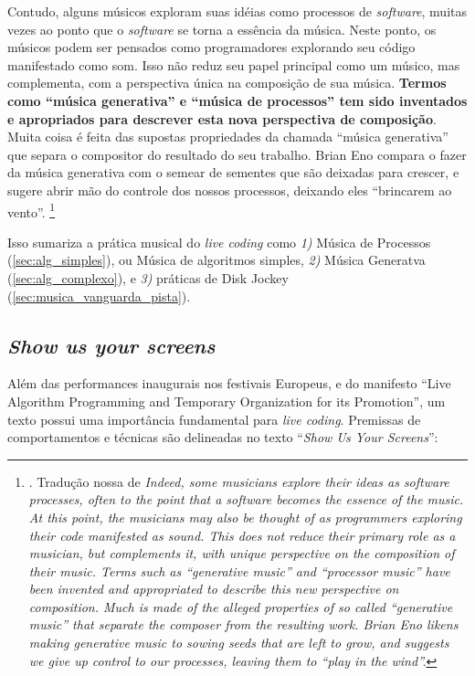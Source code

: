 \begin{citacao}
Contudo, alguns músicos exploram suas idéias como processos de \emph{software}, muitas vezes ao ponto que o \emph{software} se torna a essência da música. Neste ponto, os músicos podem ser pensados como programadores explorando seu código manifestado como som. Isso não reduz seu papel principal como um músico, mas complementa, com a perspectiva única na composição de sua música. \textbf{Termos como ``música generativa'' e ``música de processos'' tem sido inventados e apropriados para descrever esta nova perspectiva de composição}. Muita coisa é feita das supostas propriedades da chamada ``música generativa'' que separa o compositor do resultado do seu trabalho. Brian Eno compara o fazer da música generativa com o semear de sementes que são deixadas para crescer, e sugere abrir mão do controle dos nossos processos, deixando eles ``brincarem ao vento''. \footnote{. Tradução nossa de \emph{Indeed, some musicians explore their ideas as software processes, often to the point that a software becomes the essence of the music. At this point, the musicians may also be thought of as programmers exploring their code manifested as sound. This does not reduce their primary role as a musician, but complements it, with unique perspective on the composition of their music. Terms such as “generative music” and “processor music” have been invented and appropriated to describe this new perspective on composition. Much is made of the alleged properties of so called “generative music” that separate the composer from the resulting work. Brian Eno likens making generative music to sowing seeds that are left to grow, and suggests we give up control to our processes, leaving them to “play in the wind”.}}
\end{citacao}

Isso sumariza a prática musical do \emph{live coding} como \emph{1)} Música de Processos (\autoref{sec:alg_simples}), ou Música de algoritmos simples, \emph{2)} Música Generatva (\autoref{sec:alg_complexo}), e \emph{3)} práticas de Disk Jockey (\autoref{sec:musica_vanguarda_pista}).

\subsection{\emph{Show us your screens}}\label{sec:showusyourscreens}

Além das performances inaugurais nos festivais Europeus, e do manifesto ``Live Algorithm Programming and Temporary Organization for its Promotion'', um texto possui uma importância fundamental para \emph{live coding}. Premissas de comportamentos e técnicas são delineadas no texto ``\emph{Show Us Your Screens}''\cite[p.~22; online]{griffiths_fluxus:_2008,mccallum_show_2011}:

